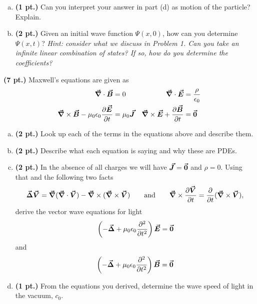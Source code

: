 \documentclass[12pt]{article} %
\newcommand{\vecfieldB}{\boldsymbol{\vec{B}}}
\newcommand{\vecfieldJ}{\boldsymbol{\vec{J}}}
\newcommand{\veclaplace}{\boldsymbol{\vec{\Delta}}}
\begin{document}
\begin{problem}
\begin{enumerate}[(a)]
	\item \textbf{(1 pt.)} Can you interpret your answer in part (d) as motion of the particle? Explain.
	\item \textbf{(2 pt.)} Given an initial wave function $\Psi(x,0)$, how can you determine $\Psi(x,t)$? \emph{Hint: consider what we discuss in Problem 1. Can you take an infinite linear combination of states? If so, how do you determine the coefficients?}
\end{enumerate}
\end{problem}


\begin{problem}
\textbf{(7 pt.)} Maxwell's equations are given as
\begin{align*}
\grad \cdot \vecfieldB &= 0  & \grad \cdot \vecfieldE &= \frac{\rho}{\epsilon_0}\\
\grad \times \vecfieldB -\mu_0 \epsilon_0\frac{\partial \vecfieldE}{\partial t}&=\mu_0 \vecfieldJ & \grad \times \vecfieldE + \frac{\partial \vecfieldB}{\partial t} &= \zerovec
\end{align*}
\begin{enumerate}[(a)]
    \item \textbf{(2 pt.)} Look up each of the terms in the equations above and describe them.
    \item \textbf{(2 pt.)} Describe what each equation is saying and why these are PDEs.
    \item \textbf{(2 pt.)} In the absence of all charges we will have $\vecfieldJ=\zerovec$ and $\rho=0$.  Using that and the following two facts
    \[
    \veclaplace \vecfieldV = \grad (\grad \cdot \vecfieldV) - \grad \times (\grad \times \vecfieldV) \qquad \textrm{and} \qquad \grad \times \frac{\partial \vecfieldV}{\partial t} = \frac{\partial}{\partial t} (\grad \times \vecfieldV),
    \]
    derive the vector wave equations for light
    \[
    \left( - \veclaplace + \mu_0 \epsilon_0 \frac{\partial^2 }{\partial t^2}\right) \vecfieldE = \zerovec
    \]
    and
    \[
    \left( - \veclaplace + \mu_0 \epsilon_0 \frac{\partial^2 }{\partial t^2}\right) \vecfieldB = \zerovec
    \]
    \item \textbf{(1 pt.)} From the equations you derived, determine the wave speed of light in the vacuum, $c_0$.
\end{enumerate}
\end{problem}
\end{document}
